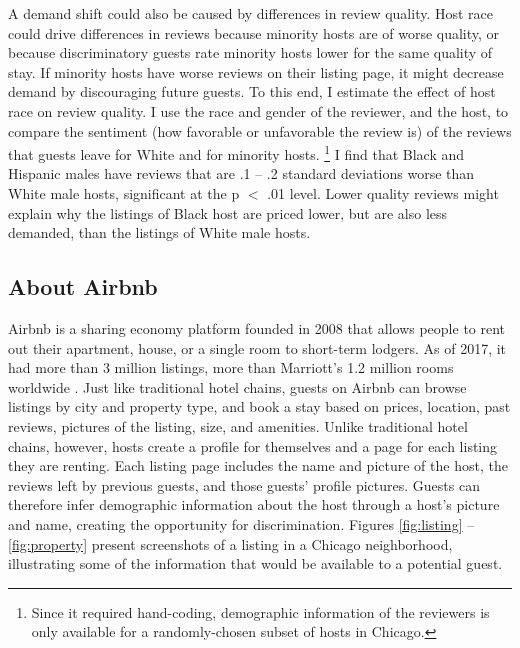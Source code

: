 A demand shift could also be caused by differences in review quality. Host race could drive differences in reviews because minority hosts are of worse quality, or because discriminatory guests rate minority hosts lower for the same quality of stay. If minority hosts have worse reviews on their listing page, it might decrease demand by discouraging future guests. To this end, I estimate the effect of host race on review quality. I use the race and gender of the reviewer, and the host, to compare the sentiment (how favorable or unfavorable the review is) of the reviews that guests leave for White and for minority hosts.%
	\footnote{Since it required hand-coding, demographic information of the reviewers is only available for a randomly-chosen subset of hosts in Chicago.} 
I find that Black and Hispanic males have reviews that are .1 -- .2 standard deviations worse than White male hosts, significant at the p $<$ .01 level. Lower quality reviews might explain why the listings of Black host are priced lower, but are also less demanded, than the listings of White male hosts. 


\subsection{About Airbnb} 
\label{about}

Airbnb is a sharing economy platform founded in 2008 that allows people to rent out their apartment, house, or a single room to short-term lodgers. As of 2017, it had more than 3 million listings, more than Marriott's 1.2 million rooms worldwide \citep{aboutus}. Just like traditional hotel chains, guests on Airbnb can browse listings by city and property type, and book a stay based on prices, location, past reviews, pictures of the listing, size, and amenities. Unlike traditional hotel chains, however, hosts create a profile for themselves and a page for each listing they are renting. Each listing page includes the name and picture of the host, the reviews left by previous guests, and those guests' profile pictures. Guests can therefore infer demographic information about the host through a host's picture and name, creating the opportunity for discrimination. Figures \ref{fig:listing} -- \ref{fig:property} present screenshots of a listing in a Chicago neighborhood, illustrating some of the information that would be available to a potential guest. %


